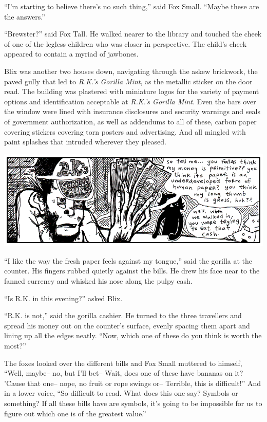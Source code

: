 \documentclass[10pt,twoside]{report}
\begin{document}
``I'm starting to believe there's no such thing,'' said Fox Small.
``Maybe these are the answers.''

``Brewster?'' said Fox Tall.  He walked nearer to the library and
touched the cheek of one of the legless children who was closer in
perspective.  The child's cheek appeared to contain a myriad of
jawbones.

Blix was another two houses down, navigating through the askew
brickwork, the paved gully that led to {\em R.K.'s Gorilla Mint}, as
the metallic sticker on the door read.  The building was plastered
with miniature logos for the variety of payment options and
identification acceptable at {\em R.K.'s Gorilla Mint}.  Even the bars
over the window were lined with insurance disclosures and security
warnings and seals of government authorization, as well as addendums
to all of these, carbon paper covering stickers covering torn posters
and advertising.  And all mingled with paint splashes that intruded
wherever they pleased.

	\includegraphics[width=1.0\textwidth]{cache/72.png}

``I like the way the fresh paper feels against my tongue,'' said the
        gorilla at the counter. His fingers rubbed quietly against the
        bills.  He drew his face near to the fanned currency and
        whisked his nose along the pulpy cash.

``Is R.K. in this evening?'' asked Blix.

``R.K. is not,'' said the gorilla cashier.  He turned to the three
        travellers and spread his money out on the counter's surface,
        evenly spacing them apart and lining up all the edges neatly.
        ``Now, which one of these do you think is worth the most?''

The foxes looked over the different bills and Fox Small muttered to
himself, ``Well, maybe-- no, but I'll bet-- Wait, does one of these
have bananas on it?  'Cause that one-- nope, no fruit or rope swings
or-- Terrible, this is difficult!''  And in a lower voice, ``So
difficult to read.  What does this one say?  Symbols or something? If
all these bills have are symbols, it's going to be impossible for us
to figure out which one is of the greatest value.''
\end{document}
